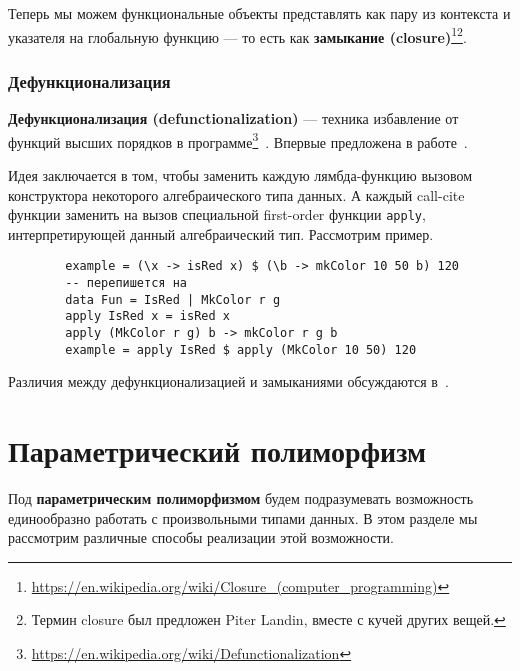 \documentclass[12pt]{article}
\newcommand{\vocab}[1]{\textbf{#1}} %
\begin{document}
    Теперь мы можем функциональные объекты представлять как пару из контекста и указателя на глобальную функцию --- то есть как \vocab{замыкание (closure)}\footnote{\url{https://en.wikipedia.org/wiki/Closure_(computer_programming)}}\footnote{Термин closure был предложен Piter Landin, вместе с кучей других вещей.}.


    \subsubsection{Дефункционализация} \label{subsubsec:defunctionalization}

    \vocab{Дефункционализация (defunctionalization)} --- техника избавление от функций высших порядков в программе\footnote{\url{https://en.wikipedia.org/wiki/Defunctionalization}}~\cite{defunctionalization-slides}.
    Впервые предложена в работе~\cite{reynolds1972definitional}.

    Идея заключается в том, чтобы заменить каждую лямбда-функцию вызовом конструктора некоторого алгебраического типа данных.
    А каждый call-cite функции заменить на вызов специальной first-order функции \texttt{apply}, интерпретирующей данный алгебраический тип.
    Рассмотрим пример.

    \begin{verbatim}
        example = (\x -> isRed x) $ (\b -> mkColor 10 50 b) 120
        -- перепишется на
        data Fun = IsRed | MkColor r g
        apply IsRed x = isRed x
        apply (MkColor r g) b -> mkColor r g b
        example = apply IsRed $ apply (MkColor 10 50) 120
    \end{verbatim}

    Различия между дефункционализацией и замыканиями обсуждаются в~\cite{reynolds1998definitional, defunctionalization-slides}.


    \section{Параметрический полиморфизм}

    Под \vocab{параметрическим полиморфизмом} будем подразумевать возможность единообразно работать с произвольными типами данных.
    В этом разделе мы рассмотрим различные способы реализации этой возможности.
\end{document}
